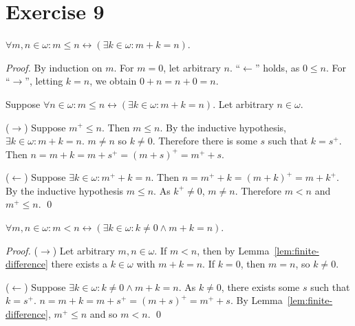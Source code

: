 \documentclass[11pt]{llncs}
\begin{document}
\section*{Exercise 9}
\begin{lemma}\label{lem:finite-difference}
  $\forall m, n \in \omega: m \leq n \leftrightarrow (\exists k \in \omega: m + k = n)$.
\end{lemma}
\begin{proof}
  By induction on $m$. For $m = 0$, let arbitrary $n$.
  ``$\leftarrow$'' holds, as $0 \leq n$.
  For ``$\rightarrow$'', letting $k = n$, we obtain $0 + n = n + 0 = n$.

  Suppose $\forall n \in \omega: m \leq n \leftrightarrow (\exists k \in \omega: m + k = n)$.
  Let arbitrary $n \in \omega$.

  \item{($\rightarrow$)}
  Suppose $m^+ \leq n$. Then $m \leq n$. By the inductive hypothesis,
  $\exists k \in \omega: m + k = n$. $m \neq n$ so $k \neq 0$.
  Therefore there is some $s$ such that $k = s^+$. Then
  $n = m + k = m + s^+ = (m + s)^+ = m^+ + s$.

  \item{($\leftarrow$)}
  Suppose $\exists k \in \omega: m^+ + k = n$. Then
  $n = m^+ + k = (m + k)^+ = m + k^+$. By the inductive hypothesis
  $m \leq n$. As $k^+ \neq 0$, $m \neq n$. Therefore $m < n$ and $m^+ \leq n$.
  \qed
\end{proof}

\begin{lemma}
  $\forall m, n \in \omega: m < n \leftrightarrow (\exists k \in \omega: k \neq 0 \land m + k = n)$.
\end{lemma}
\begin{proof}
  \item{($\rightarrow$)}
  Let arbitrary $m, n \in \omega$. If $m < n$, then by
  Lemma~\ref{lem:finite-difference} there exists a $k \in \omega$ with
  $m + k = n$. If $k = 0$, then $m = n$, so $k \neq 0$.

  \item{($\leftarrow$)}
  Suppose $\exists k \in \omega: k \neq 0 \land m + k = n$. As $k \neq 0$, there
  exists some $s$ such that $k = s^+$. $n = m + k = m + s^+ = (m + s)^+ = m^+ + s$.
  By Lemma~\ref{lem:finite-difference}, $m^+ \leq n$ and so $m < n$.
  \qed
\end{proof}
\end{document}
